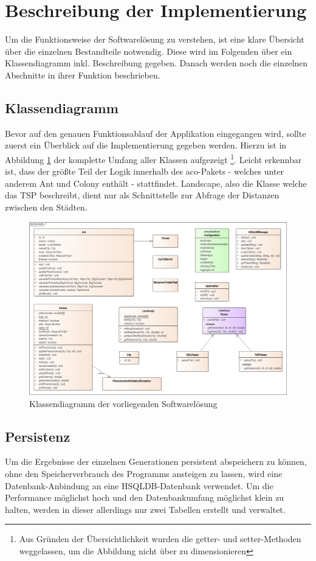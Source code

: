\section{Beschreibung der Implementierung}
Um die Funktionsweise der Softwarelösung zu verstehen, ist eine klare Übersicht über die einzelnen Bestandteile notwendig. Diese wird im Folgenden über ein Klassendiagramm inkl. Beschreibung gegeben. Danach werden noch die einzelnen Abschnitte in ihrer Funktion beschrieben.

\subsection{Klassendiagramm}
Bevor auf den genauen Funktionsablauf der Applikation eingegangen wird, sollte zuerst ein Überblick auf die Implementierung gegeben werden. Hierzu ist in Abbildung \ref{classDiagram} der komplette Umfang aller Klassen aufgezeigt
\footnote{Aus Gründen der Übersichtlichkeit wurden die getter- und setter-Methoden weggelassen, um die Abbildung nicht über zu dimensionieren}. Leicht erkennbar ist, dass der größte Teil der Logik innerhalb des aco-Pakets - welches unter anderem Ant und Colony enthält - stattfindet. Landscape, also die Klasse welche das \ac{TSP} beschreibt, dient nur als Schnittstelle zur Abfrage der Distanzen zwischen den Städten.

\begin{figure}[h]
	\centering
	\includegraphics[width=\linewidth]{../../../01_uml/classModel.png}
	\caption{Klassendiagramm der vorliegenden Softwarelösung}
	\label{classDiagram}
\end{figure}

\subsection{Persistenz}
Um die Ergebnisse der einzelnen Generationen persistent abspeichern zu können, ohne den Speicherverbrauch des Programms ansteigen zu lassen, wird eine Datenbank-Anbindung an eine HSQLDB-Datenbank verwendet. Um die Performance möglichst hoch und den Datenbankumfang möglichst klein zu halten, werden in dieser allerdings nur zwei Tabellen erstellt und verwaltet.

